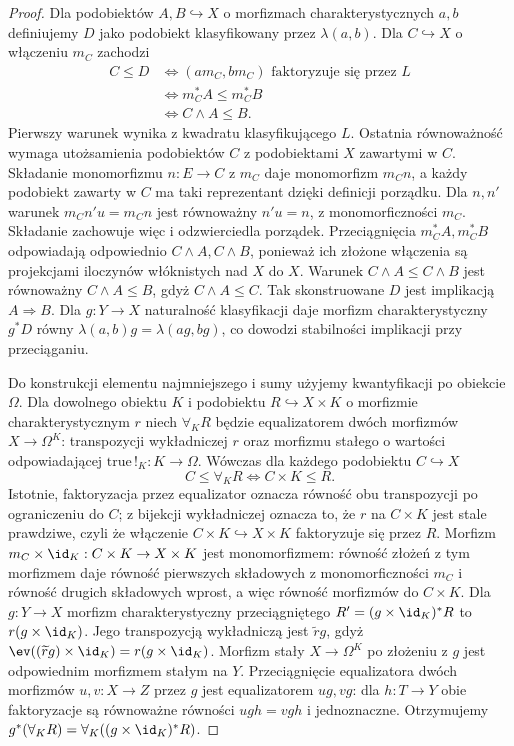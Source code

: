\begin{proof}
Dla podobiektów $A,B\hookrightarrow X$ o morfizmach charakterystycznych $a,b$ definiujemy $D$ jako podobiekt klasyfikowany przez $\lambda(a,b)$. Dla $C\hookrightarrow X$ o włączeniu $m_C$ zachodzi
\[
 \begin{aligned}
 C\leq D
 &\iff (am_C,bm_C)\text{ faktoryzuje się przez }L\\
 &\iff m_C^*A\leq m_C^*B\\
 &\iff C\wedge A\leq B.
 \end{aligned}
\]
Pierwszy warunek wynika z kwadratu klasyfikującego $L$. Ostatnia równoważność wymaga utożsamienia podobiektów $C$ z podobiektami $X$ zawartymi w $C$. Składanie monomorfizmu $n:E\to C$ z $m_C$ daje monomorfizm $m_Cn$, a każdy podobiekt zawarty w $C$ ma taki reprezentant dzięki definicji porządku. Dla $n,n'$ warunek $m_Cn'u=m_Cn$ jest równoważny $n'u=n$, z monomorficzności $m_C$. Składanie zachowuje więc i odzwierciedla porządek. Przeciągnięcia $m_C^*A,m_C^*B$ odpowiadają odpowiednio $C\wedge A,C\wedge B$, ponieważ ich złożone włączenia są projekcjami iloczynów włóknistych nad $X$ do $X$. Warunek $C\wedge A\leq C\wedge B$ jest równoważny $C\wedge A\leq B$, gdyż $C\wedge A\leq C$. Tak skonstruowane $D$ jest implikacją $A\Rightarrow B$. Dla $g:Y\to X$ naturalność klasyfikacji daje morfizm charakterystyczny $g^*D$ równy $\lambda(a,b)g=\lambda(ag,bg)$, co dowodzi stabilności implikacji przy przeciąganiu.

Do konstrukcji elementu najmniejszego i sumy użyjemy kwantyfikacji po obiekcie $\Omega$. Dla dowolnego obiektu $K$ i podobiektu $R\hookrightarrow X\times K$ o morfizmie charakterystycznym $r$ niech $\forall_K R$ będzie equalizatorem dwóch morfizmów $X\to\Omega^K$: transpozycji wykładniczej $r$ oraz morfizmu stałego o wartości odpowiadającej $\mathrm{true}\,!_K:K\to\Omega$. Wówczas dla każdego podobiektu $C\hookrightarrow X$
\[
 C\leq\forall_K R\iff C\times K\leq R.
\]
Istotnie, faktoryzacja przez equalizator oznacza równość obu transpozycji po ograniczeniu do $C$; z bijekcji wykładniczej oznacza to, że $r$ na $C\times K$ jest stale prawdziwe, czyli że włączenie $C\times K\hookrightarrow X\times K$ faktoryzuje się przez $R$. Morfizm $m_C\times\id_K:C\times K\to X\times K$ jest monomorfizmem: równość złożeń z tym morfizmem daje równość pierwszych składowych z monomorficzności $m_C$ i równość drugich składowych wprost, a więc równość morfizmów do $C\times K$. Dla $g:Y\to X$ morfizm charakterystyczny przeciągniętego $R'=(g\times\id_K)^*R$ to $r(g\times\id_K)$. Jego transpozycją wykładniczą jest $\widetilde r g$, gdyż $\ev((\widetilde r g)\times\id_K)=r(g\times\id_K)$. Morfizm stały $X\to\Omega^K$ po złożeniu z $g$ jest odpowiednim morfizmem stałym na $Y$. Przeciągnięcie equalizatora dwóch morfizmów $u,v:X\to Z$ przez $g$ jest equalizatorem $ug,vg$: dla $h:T\to Y$ obie faktoryzacje są równoważne równości $ugh=vgh$ i jednoznaczne. Otrzymujemy $g^*(\forall_K R)=\forall_K((g\times\id_K)^*R)$.


\end{proof}
